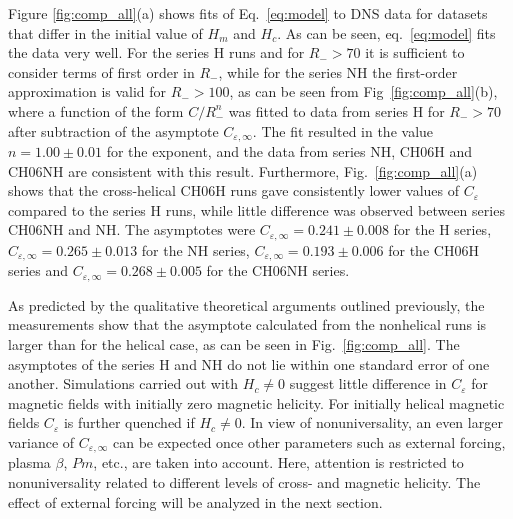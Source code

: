 \documentclass[aps,pre,onecolumn,superscriptaddress,notitlepage]{revtex4-1}
\newcommand{\Ceps}{C_\varepsilon}
\newcommand{\Cinf}{C_{\varepsilon,\infty}}
\newcommand{\blue}[1]{{#1}}
\begin{document}
Figure \ref{fig:comp_all}(a) shows fits of Eq.~\eqref{eq:model} to DNS
data for datasets that differ in the initial
value of $H_m$ and $H_c$. As can be seen, eq.~\eqref{eq:model} fits the data very well.
For the series H runs and for $R_- > 70$
it is sufficient to consider terms of first order in $R_-$,
while for the series NH the first-order approximation is valid for $R_- > 100$, 
\blue{as can be seen from Fig~\ref{fig:comp_all}(b), where 
a function of the form $C/R_-^n$ was fitted to data from series H
for $R_- > 70$ after subtraction of the asymptote $\Cinf$. 
The fit resulted in the value $n = 1.00 \pm 0.01$ for the exponent, 
and the data from series NH, CH06H and CH06NH are consistent with this 
result. Furthermore, Fig.~\ref{fig:comp_all}(a) shows that }
the cross-helical CH06H runs gave
consistently lower values of $\Ceps$ compared to the series H runs, while
little difference was observed between series CH06NH and NH.
The asymptotes were $\Cinf=0.241 \pm 0.008$
for the H series, $\Cinf=0.265 \pm 0.013$
for the NH series, $\Cinf=0.193 \pm 0.006$ for the CH06H series
and $\Cinf=0.268 \pm 0.005$ for the CH06NH series.

As predicted by the qualitative theoretical arguments outlined previously,
the measurements show that the asymptote calculated from the nonhelical runs
is larger than for the helical case,
as can be seen in Fig.~\ref{fig:comp_all}.
The asymptotes of the series H and NH do not lie within one standard
error of one another.
Simulations carried out with $H_c \neq 0$ suggest little difference
in $\Ceps$ for magnetic fields with initially zero magnetic helicity. For initially
helical magnetic fields $\Ceps$ is further quenched if $H_c \neq 0$.
In view of nonuniversality, an even larger variance
of $\Cinf$ can be expected once other parameters such as external forcing,
plasma $\beta$, $Pm$, etc., are taken into account. Here, attention is restricted
to nonuniversality related to different levels of cross- and magnetic helicity. 
The effect of external forcing will be analyzed in the next section. 
\end{document}
